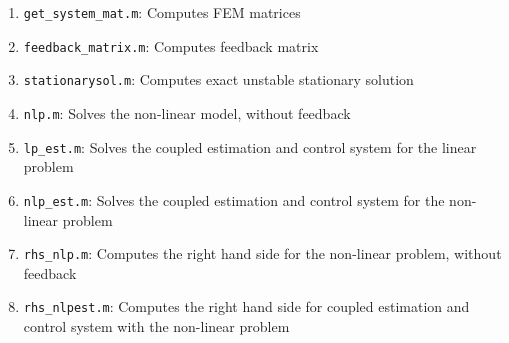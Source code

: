 \documentclass[12pt]{article}
\begin{document}
\begin{enumerate}

\item {\tt get\_system\_mat.m}: Computes FEM matrices

\item {\tt feedback\_matrix.m}: Computes feedback matrix

\item {\tt stationarysol.m}: Computes exact unstable stationary solution

\item {\tt nlp.m}: Solves the non-linear model, without feedback

\item {\tt lp\_est.m}: Solves the coupled estimation and control system for the linear problem

\item {\tt nlp\_est.m}: Solves the coupled estimation and control system for the non-linear problem

\item {\tt rhs\_nlp.m}: Computes the right hand side for the non-linear problem, without feedback

\item {\tt rhs\_nlpest.m}: Computes the right hand side for coupled estimation and control system with the non-linear problem

\end{enumerate}
\end{document}
